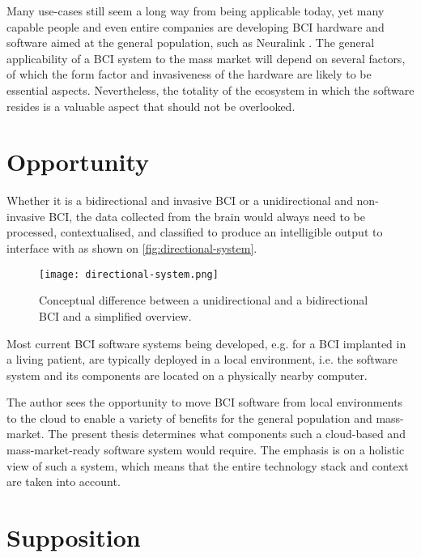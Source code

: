 Many use-cases still seem a long way from being applicable today, yet many capable people and even entire companies are developing BCI hardware and software aimed at the general population, such as Neuralink \citep{urban_neuralink_2017}. The general applicability of a BCI system to the mass market will depend on several factors, of which the form factor and invasiveness of the hardware are likely to be essential aspects. Nevertheless, the totality of the ecosystem in which the software resides is a valuable aspect that should not be overlooked.

\section{Opportunity}
\label{chapter1-opportunity}

Whether it is a bidirectional and invasive BCI or a unidirectional and non-invasive BCI, the data collected from the brain would always need to be processed, contextualised, and classified to produce an intelligible output to interface with as shown on \autoref{fig:directional-system}.

\begin{figure}[ht]
  \centering
  \texttt{[image: directional-system.png]}
  \caption{Conceptual difference between a unidirectional and a bidirectional BCI and a simplified overview.}
  \label{fig:directional-system}
\end{figure}

Most current BCI software systems being developed, e.g. for a BCI implanted in a living patient, are typically deployed in a local environment, i.e. the software system and its components are located on a physically nearby computer.

The author sees the opportunity to move BCI software from local environments to the cloud to enable a variety of benefits for the general population and mass-market. The present thesis determines  what components such a cloud-based and mass-market-ready software system would require. The emphasis is on a holistic view of such a system, which means that the entire technology stack and context are taken into account.

\section{Supposition}
\label{chapter1-supposition}

